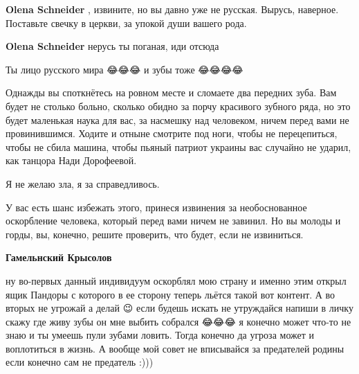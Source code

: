 \begin{itemize}
\begin{itemize}
\textbf{Olena Schneider} , извините, но вы давно уже не русская. Вырусь, наверное. Поставьте свечку в церкви, за упокой души вашего рода.

 
\textbf{Olena Schneider} нерусь ты поганая, иди отсюда
\end{itemize}

 
Ты лицо русского мира 😂😂😂 и зубы тоже 😂😂😂😂

\begin{itemize}
 

Однажды вы споткнётесь на ровном месте и сломаете два передних зуба. Вам будет
не столько больно, сколько обидно за порчу красивого зубного ряда, но это будет
маленькая наука для вас, за насмешку над человеком, ничем перед вами не
провинившимся. Ходите и отныне смотрите под ноги, чтобы не перецепиться, чтобы
не сбила машина, чтобы пьяный патриот украины вас случайно не ударил, как
танцора Нади Дорофеевой.

Я не желаю зла, я за справедливось.

У вас есть шанс избежать этого, принеся извинения за необоснованное оскорбление
человека, который перед вами ничем не завинил. Но вы молоды и горды, вы,
конечно, решите проверить, что будет, если не извиниться.


 
\textbf{Гамельнский Крысолов} 

ну во-первых данный индивидуум оскорблял мою страну и именно этим открыл ящик
Пандоры с которого в ее сторону теперь льётся такой вот контент. А во вторых не
угрожай а делай 😉 если будешь искать не утруждайся напиши в личку скажу где
живу \Smiley[1.0][yellow] зубы он мне выбить собрался 😂😂😂 я конечно может что-то не знаю и ты
умеешь пули зубами ловить. Тогда конечно да угроза может и воплотиться в жизнь.
А вообще мой совет не вписывайся за предателей родины если конечно сам не
предатель :)))



\end{itemize}
\end{itemize}
